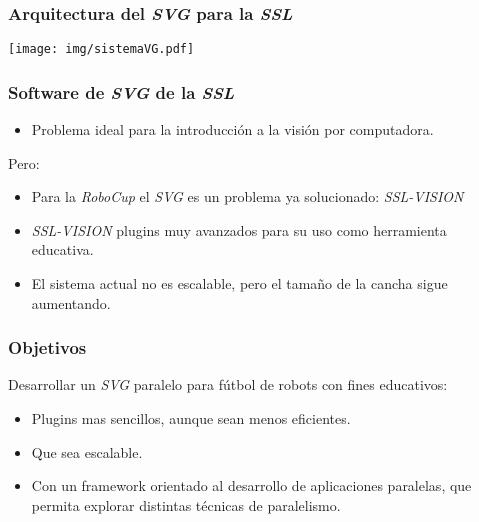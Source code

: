 \documentclass[11pt,a4paper,spanish]{beamer}
\begin{document}
\begin{frame}

\frametitle{Arquitectura del \emph{SVG} para la \emph{SSL}}

\texttt{[image: img/sistemaVG.pdf]}

\end{frame}

\begin{frame}

\frametitle{Software de \emph{SVG} de la \emph{SSL}}

\begin{itemize}

	\item Problema ideal para la introducción a la visión por computadora.

\end{itemize}

Pero:

\begin{itemize}

	\item Para la \emph{RoboCup} el \emph{SVG} es un problema ya
		solucionado: \emph{SSL-VISION}
	
	\item \emph{SSL-VISION} plugins muy avanzados para su uso como
		herramienta educativa.

	\item El sistema actual no es escalable, pero el tamaño de la cancha
		sigue aumentando.

\end{itemize}

\end{frame}

\begin{frame}

\frametitle{Objetivos}

Desarrollar un \emph{SVG} paralelo para fútbol de robots con fines educativos:

\begin{itemize}

	\item Plugins mas sencillos, aunque sean menos eficientes.

	\item Que sea escalable.

	\item Con un framework orientado al desarrollo de aplicaciones
		paralelas, que permita explorar distintas técnicas de
		paralelismo.

\end{itemize}

\end{frame}
\end{document}

